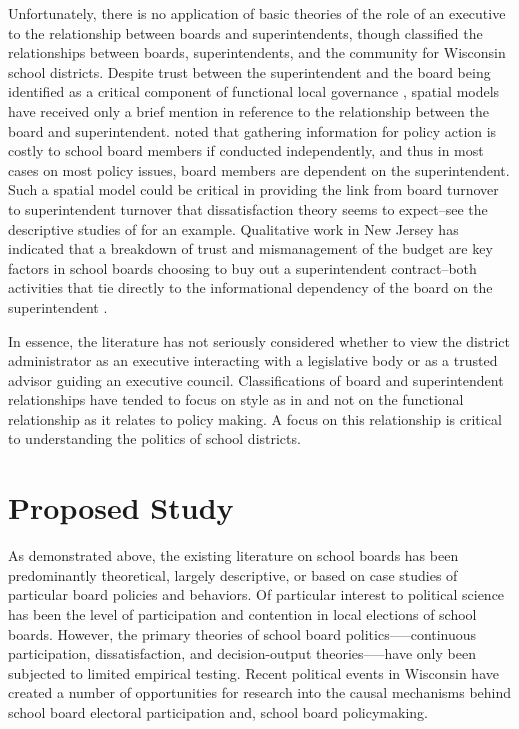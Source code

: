 Unfortunately, there is no application of basic theories of the role of an executive to the relationship between boards and superintendents, though \citet{RefWorks:251} classified the relationships between boards, superintendents, and the community for Wisconsin school districts. Despite trust between the superintendent and the board being identified as a critical component of functional local governance \citep[see][]{RefWorks:229,RefWorks:234,RefWorks:227,RefWorks:233}, spatial models have received only a brief mention in reference to the relationship between the board and superintendent. \citet{RefWorks:340} noted that gathering information for policy action is costly to school board members if conducted independently, and thus in most cases on most policy issues, board members are dependent on the superintendent. Such a spatial model could be critical in providing the link from board turnover to superintendent turnover that dissatisfaction theory seems to expect--see the descriptive studies of \citet{RefWorks:311} for an example. Qualitative work in New Jersey has indicated that a breakdown of trust and mismanagement of the budget are key factors in school boards choosing to buy out a superintendent contract--both activities that tie directly to the informational dependency of the board on the superintendent \citep{RefWorks:246}. 

In essence, the literature has not seriously considered whether to view the district administrator as an executive interacting with a legislative body or as a trusted advisor guiding an executive council. Classifications of board and superintendent relationships have tended to focus on style as in \citet{RefWorks:251} and not on the functional relationship as it relates to policy making. A focus on this relationship is critical to understanding the politics of school districts. 



\section{Proposed Study}
As demonstrated above, the existing literature on school boards has been predominantly theoretical, largely descriptive, or based on case studies of particular board policies and behaviors. Of particular interest to political science has been the level of participation and contention in local elections of school boards. However, the primary theories of school board politics—--continuous participation, dissatisfaction, and decision-output theories—--have only been subjected to limited empirical testing. Recent political events in Wisconsin have created a number of opportunities for research into the causal mechanisms behind school board electoral participation and, school board policymaking.

